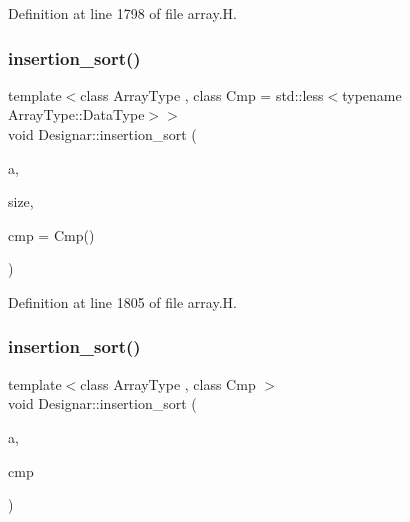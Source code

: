Definition at line 1798 of file array.\+H.

\mbox{\label{namespace_designar_a8655d6fa8772dee92565bf7475e5612d}} 
\subsubsection{\texorpdfstring{insertion\+\_\+sort()}{insertion\_sort()}\hspace{0.1cm}{\footnotesize\ttfamily [4/6]}}
{\footnotesize\ttfamily template$<$class Array\+Type , class Cmp  = std\+::less$<$typename Array\+Type\+::\+Data\+Type$>$$>$ \\
void Designar\+::insertion\+\_\+sort (\begin{DoxyParamCaption}\item[{Array\+Type \&}]{a,  }\item[{\hyperlink{namespace_designar_a9d113d66a39e82b73727c72cd3a52f73}{lint\+\_\+t}}]{size,  }\item[{Cmp \&\&}]{cmp = {\ttfamily Cmp()} }\end{DoxyParamCaption})\hspace{0.3cm}{\ttfamily [inline]}}



Definition at line 1805 of file array.\+H.

\mbox{\label{namespace_designar_ab78e23e3c8eb0365e27244f5de2532d2}} 
\subsubsection{\texorpdfstring{insertion\+\_\+sort()}{insertion\_sort()}\hspace{0.1cm}{\footnotesize\ttfamily [5/6]}}
{\footnotesize\ttfamily template$<$class Array\+Type , class Cmp $>$ \\
void Designar\+::insertion\+\_\+sort (\begin{DoxyParamCaption}\item[{Array\+Type \&}]{a,  }\item[{Cmp \&}]{cmp }\end{DoxyParamCaption})\hspace{0.3cm}{\ttfamily [inline]}}



